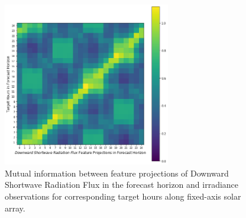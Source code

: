 \begin{figure}[htb]
    \begin{center}
    	\includegraphics[width=0.65\textwidth]{chapter3/fig_mi_forecast_target.png}
    	\caption[Mutual information between Downward Shortwave Radiation Flux feature projections in forecast horizon and irradiance observations for corresponding target hours from fixed-axis solar array]{Mutual information between feature projections of Downward Shortwave Radiation Flux in the forecast horizon and irradiance observations for corresponding target hours along fixed-axis solar array.}
    	\label{fig:fig_mi_forecast_target}
    \end{center}
\end{figure}

